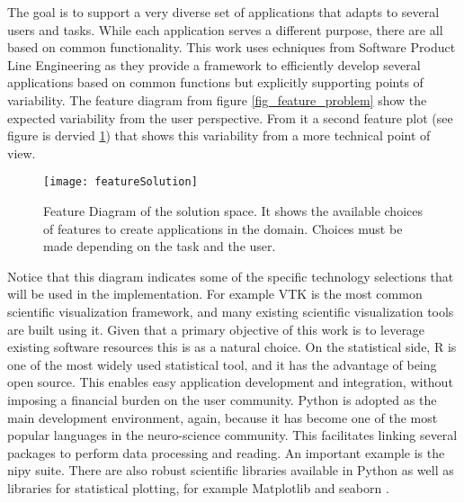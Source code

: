 The goal is to support a very diverse set of applications that adapts to several users and tasks. While each application serves a different purpose, there are all based on common functionality. This work uses echniques from Software Product Line Engineering \autocite{pohl_software_2005} as they provide a framework to efficiently develop several applications based on common functions but explicitly supporting points of variability. The feature diagram from figure \ref{fig_feature_problem} show the expected variability from the user perspective. From it a second feature plot (see figure is dervied \ref{fig_feature_solution}) that shows this variability from a more technical point of view.  

\begin{figure}
\centering
\texttt{[image: featureSolution]}
\caption{\label{fig_feature_solution}Feature Diagram of the solution space. It shows the available choices of features to create applications in the domain. Choices must be made depending on the task and the user.}
\end{figure}

Notice that this diagram indicates some of the specific technology selections that will be used in the implementation. For example VTK \autocite{schroeder_vtk_1998} is the most common scientific visualization framework, and many existing scientific visualization tools are built using it. Given that a primary objective of this work is to leverage existing software resources this is as a natural choice. On the statistical side, R \autocite{team_r:_2012} is one of the most widely used statistical tool, and it has the advantage of being open source. This enables easy  application development and integration, without imposing a financial burden on the user community. Python is adopted as the main development environment, again, because it has become one of the most popular languages in the neuro-science  community. This facilitates linking several packages to perform data processing and reading. An important example is the nipy \autocite{gorgolewski_nipype:_2011-1} suite. There are also robust scientific libraries \autocite{van_der_walt_numpy_2011, jones_scipy:_2001,mckinney_data_2010} available in Python as well as libraries for statistical plotting, for example Matplotlib \autocite{hunter_matplotlib:_2007} and seaborn \autocite{michael_waskom_seaborn:_2015}.

